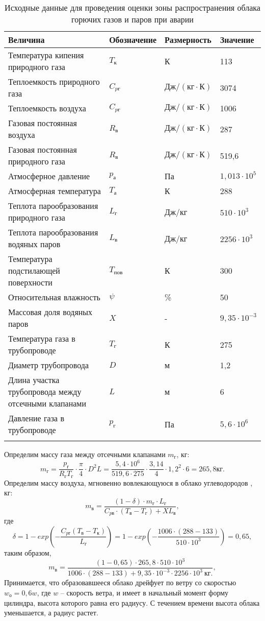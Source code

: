 \begin{longtable}{|p{4cm}|p{4cm}|p{4cm}|p{4cm}|}
	\hline
	\textbf{Величина} & 
	\textbf{Обозначение} &
	\textbf{Размерность} &
	\textbf{Значение} \\ \hline
	\endhead

	Температура кипения природного газа & $T_к$ & К & 113 \\ \hline
	Теплоемкость природного газа & $C_{pг}$ & $Дж/(кг \cdot К)$ & 3074 \\ \hline
	Теплоемкость воздуха & $C_{pг}$ & $Дж/(кг \cdot К)$ & 1006 \\ \hline
	Газовая постоянная воздуха & $R_в$ & $Дж/(кг \cdot К)$ & 287 \\ \hline
	Газовая постоянная природного газа & $R_в$ & $Дж/(кг \cdot К)$ & 519,6 \\ \hline
	Атмосферное давление & $p_а$ & Па & $1,013 \cdot 10^5$ \\ \hline
	Атмосферная температура & $T_а$ & К & 288 \\ \hline
	Теплота парообразования природного газа & $L_г$ & Дж/кг & $510 \cdot 10^3$ \\ \hline
	Теплота парообразования водяных паров & $L_в$ & Дж/кг & $2256 \cdot 10^3$ \\ \hline
	Температура подстилающей поверхности & $T_{пов}$ & К & 300 \\ \hline
	Относительная влажность & $\psi$ & \% & 50 \\ \hline
	Массовая доля водяных паров & $X$ & - & $9,35 \cdot 10^{-3}$ \\ \hline
	Температура газа в трубопроводе & $T_г$ & К & 275 \\ \hline
	Диаметр трубопровода & $D$ & м & 1,2 \\ \hline
	Длина участка трубопровода между отсечными клапанами & $L$ & м & 6 \\ \hline
	Давление газа в трубопроводе & $p_г$ & Па & $5,6 \cdot 10^6$ \\ \hline	
	\caption{Исходные данные для проведения оценки зоны распространения облака горючих газов и паров при аварии} \label{tab:ecology-cloud-input}
\end{longtable}

Определим массу газа между отсечными клапанами $m_г$, кг:
$$
	m_г = \frac{
		p_г
	}{
		R_г T_г
	} \cdot \frac{\pi}{4} \cdot D^2 L = \frac{
		5,4 \cdot 10^6
	}{
		519,6 \cdot 275
	} \cdot \frac{3,14}{4} \cdot 1,2^2 \cdot 6 = 265,8 кг.
$$
Определим массу воздуха, мгновенно вовлекающуюся в облако углеводородов , кг:
$$
	m_в = \frac{
		(1 - \delta) \cdot m_г \cdot L_г
	}{
		C_{pв} \cdot (T_в - T_г) + XL_в
	},
$$
где
$$
	\delta = 1 - exp\left( 
		-\frac{
			C_{pг}(T_в - T_к)
		}{
			L_г
		} 
	\right) = 1 - exp\left( 
		-\frac{
			1006 \cdot (288 - 133)
		}{
			510 \cdot 10^3
		}
	\right) = 0,65,
$$
таким образом,
$$
	m_в = \frac{
		(1 - 0,65) \cdot 265,8 \cdot 510 \cdot 10^3
	}{
		1006 \cdot (288 - 133) + 9,35 \cdot 10^{-3} \cdot 2256 \cdot 10^3 \ кг.
	},
$$
Принимается, что образовавшееся облако дрейфует по ветру со скоростью $w_о = 0,6 w$, где $w$ – скорость ветра, и имеет в начальный момент форму цилиндра, высота которого равна его радиусу. С течением времени высота облака уменьшается, а радиус растет.

